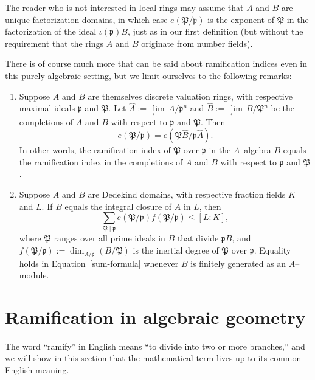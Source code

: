 \documentclass[12pt]{article}
\newcommand{\p}{{\mathfrak{p}}}
\renewcommand{\P}{{\mathfrak{P}}}
\renewcommand{\div}{\mid}
\newcommand{\ilim}{\,\underset{\longleftarrow}{\lim}\,}
\theoremstyle{definition}
\begin{document}
The reader who is not interested in local rings may assume that $A$
and $B$ are unique factorization domains, in which case $e(\P/\p)$ is
the exponent of $\P$ in the factorization of the ideal $\iota(\p) B$,
just as in our first definition (but without the requirement that the
rings $A$ and $B$ originate from number fields).

There is of course much more that can be said about ramification
indices even in this purely algebraic setting, but we limit ourselves
to the following remarks:

\begin{enumerate}
\item Suppose $A$ and $B$ are themselves discrete valuation rings,
with respective maximal ideals $\p$ and $\P$. Let $\hat{A} := \ilim
A/\p^n$ and $\hat{B} := \ilim B/\P^n$ be the completions of $A$
and $B$ with respect to $\p$ and $\P$. Then
\begin{equation}\label{completion}
e(\P/\p) = e(\P\hat{B}/\p\hat{A}).
\end{equation}
In other words, the ramification index of $\P$ over $\p$ in the
$A$--algebra $B$ equals the ramification index in the completions of
$A$ and $B$ with respect to $\p$ and $\P$.
\item Suppose $A$ and $B$ are Dedekind domains, with respective
fraction fields $K$ and $L$. If $B$ equals the integral closure of $A$
in $L$, then
\begin{equation}\label{sum-formula}
\sum_{\P \div \p} e(\P/\p) f(\P/\p) \leq [L:K],
\end{equation}
where $\P$ ranges over all prime ideals in $B$ that divide $\p B$, and
$f(\P/\p) := \dim_{A/\p}(B/\P)$ is the inertial degree of $\P$ over
$\p$. Equality holds in Equation~\eqref{sum-formula} whenever $B$ is
finitely generated as an $A$--module.
\end{enumerate}

\section{Ramification in algebraic geometry}

The word ``ramify'' in English means ``to divide into two or more
branches,'' and we will show in this section that the mathematical term
lives up to its common English meaning.
\end{document}
